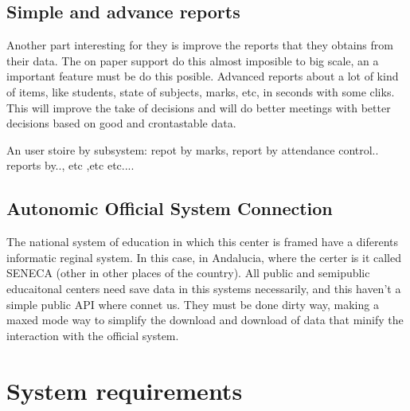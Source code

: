 \bigskip
\subsection{Simple and advance reports}
\bigskip

Another part interesting for they is improve the reports that they obtains from their data. The on paper support do this almost imposible to big scale, an a important feature must be do this posible. Advanced reports about a lot of kind of items, like students, state of subjects, marks, etc, in seconds with some cliks.
This will improve the take of decisions and will do better meetings with better decisions based on good and crontastable data.


An user stoire by subsystem: repot by marks, report by attendance control..
reports by.., etc ,etc etc....

\bigskip
\subsection{Autonomic Official System Connection}
\bigskip

The national system of education in which this center is framed have a diferents informatic reginal system. In this case, in Andalucia, where the certer is it called SENECA (other in other places of the country). All public and semipublic educaitonal centers need save data in this systems necessarily, and this haven't a simple public API where connet us. They must be done dirty way, making a maxed mode way to simplify the download and download of data that minify the interaction with the official system.

\noindent{}


\section{System requirements}
